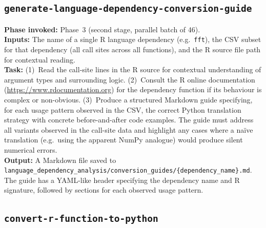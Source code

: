 \documentclass[12pt,a4paper]{article}
\begin{document}
\subsection{\texttt{generate-language-dependency-conversion-guide}}
\label{supp:agent-conversion-guide}

\textbf{Phase invoked:} Phase~3 (second stage, parallel batch of 46).\\
\textbf{Inputs:} The name of a single R language dependency (e.g.\ \texttt{fft}), the CSV subset for that dependency (all call sites across all functions), and the R source file path for contextual reading.\\
\textbf{Task:} (1)~Read the call-site lines in the R source for contextual understanding of argument types and surrounding logic. (2)~Consult the R online documentation (\url{https://www.rdocumentation.org}) for the dependency function if its behaviour is complex or non-obvious. (3)~Produce a structured Markdown guide specifying, for each usage pattern observed in the CSV, the correct Python translation strategy with concrete before-and-after code examples. The guide must address all variants observed in the call-site data and highlight any cases where a na\"{i}ve translation (e.g.\ using the apparent NumPy analogue) would produce silent numerical errors.\\
\textbf{Output:} A Markdown file saved to \texttt{language\_dependency\_analysis/conversion\_guides/\{dependency\_name\}.md}. The guide has a YAML-like header specifying the dependency name and R signature, followed by sections for each observed usage pattern.

\subsection{\texttt{convert-r-function-to-python}}
\label{supp:agent-convert-fn}
\end{document}
